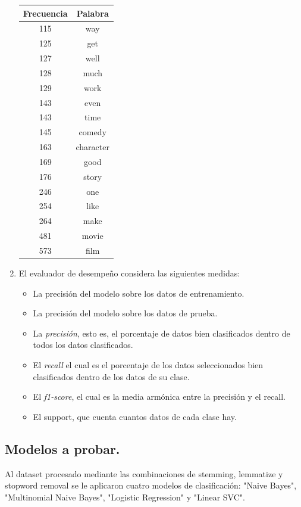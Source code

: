 \documentclass[11pt,letterpaper]{article}
\begin{document}
\begin{enumerate}
\begin{center}
\begin{tabular}{|c|c|}
\hline
Frecuencia & Palabra\\
\hline
115 & way\\
125 & get\\
127 & well\\
128 & much\\
129 & work\\
143 & even\\
143 & time\\
145 & comedy\\
163 & character\\
169 & good\\
176 & story\\
246 & one\\
254 & like\\
264 & make\\
481 & movie\\
573 & film\\
\hline
\end{tabular}
\end{center}
\item El evaluador de desempeño considera las siguientes medidas:
\begin{itemize}
\item La precisión del modelo sobre los datos de entrenamiento.
\item La precisión del modelo sobre los datos de prueba.
\item La \emph{precisión}, esto es, el porcentaje de datos bien clasificados dentro de
todos los datos clasificados.
\item El \emph{recall} el cual es el porcentaje de los datos seleccionados bien
clasificados dentro de los datos de su clase.
\item El \emph{f1-score}, el cual es la media armónica entre la precisión y el
recall.
\item El support, que cuenta cuantos datos de cada clase hay.
\end{itemize}
\end{enumerate}
\subsection{Modelos a probar.}
\label{sec:orgheadline3}
Al dataset procesado mediante las combinaciones de stemming, lemmatize y
stopword removal se le aplicaron cuatro modelos de clasificación: "Naive
Bayes", "Multinomial Naive Bayes", "Logistic Regression" y "Linear SVC". 
\end{document}
